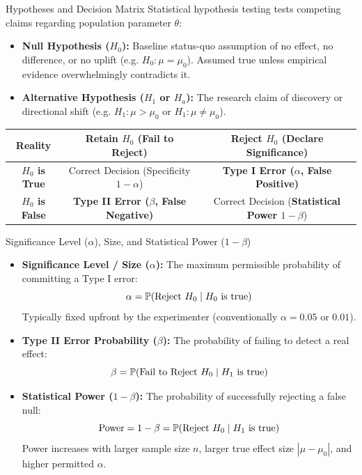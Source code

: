 \begin{definitionbox}{Hypotheses and Decision Matrix}
Statistical hypothesis testing tests competing claims regarding population parameter $\theta$:
\begin{itemize}
    \item \textbf{Null Hypothesis ($H_0$):} Baseline status-quo assumption of no effect, no difference, or no uplift (e.g. $H_0 \colon \mu = \mu_0$). Assumed true unless empirical evidence overwhelmingly contradicts it.
    \item \textbf{Alternative Hypothesis ($H_1$ or $H_a$):} The research claim of discovery or directional shift (e.g. $H_1 \colon \mu > \mu_0$ or $H_1 \colon \mu \neq \mu_0$).
\end{itemize}
\begin{center}
\renewcommand{\arraystretch}{1.3}
\begin{tabular}{c|cc}
\toprule
\textbf{Reality} & \textbf{Retain $H_0$ (Fail to Reject)} & \textbf{Reject $H_0$ (Declare Significance)} \\
\midrule
\textbf{$H_0$ is True} & Correct Decision (Specificity $1 - \alpha$) & \textbf{Type I Error ($\alpha$, False Positive)} \\
\textbf{$H_0$ is False} & \textbf{Type II Error ($\beta$, False Negative)} & Correct Decision (\textbf{Statistical Power $1 - \beta$}) \\
\bottomrule
\end{tabular}
\end{center}
\end{definitionbox}

\begin{formulabox}{Significance Level ($\alpha$), Size, and Statistical Power ($1 - \beta$)}
\begin{itemize}
    \item \textbf{Significance Level / Size ($\alpha$):} The maximum permissible probability of committing a Type I error:
    $$\alpha = \P(\text{Reject } H_0 \mid H_0 \text{ is true})$$
    Typically fixed upfront by the experimenter (conventionally $\alpha = 0.05$ or $0.01$).
    \item \textbf{Type II Error Probability ($\beta$):} The probability of failing to detect a real effect:
    $$\beta = \P(\text{Fail to Reject } H_0 \mid H_1 \text{ is true})$$
    \item \textbf{Statistical Power ($1 - \beta$):} The probability of successfully rejecting a false null:
    $$\text{Power} = 1 - \beta = \P(\text{Reject } H_0 \mid H_1 \text{ is true})$$
    Power increases with larger sample size $n$, larger true effect size $|\mu - \mu_0|$, and higher permitted $\alpha$.
\end{itemize}
\end{formulabox}

